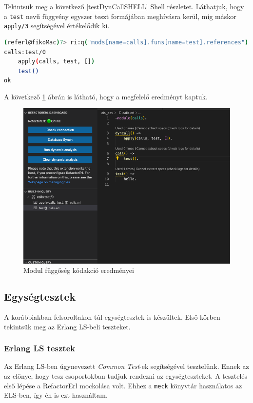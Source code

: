 Tekintsük meg a következő \ref{testDynCallSHELL} Shell részletet. Láthatjuk, hogy a \lstinline{test} nevű függvény egyszer teszt formájában meghívásra kerül, míg máskor \lstinline{apply/3} segítségével értékelődik ki.


\lstset{caption=Függvény dinamikus hívásainak lekérdezésének eredménye, label=testDynCallSHELL} 
\begin{lstlisting}[language={sh}]  
(referl@fikoMac)7> ri:q("mods[name=calls].funs[name=test].references").
calls:test/0
    apply(calls, test, [])
    test()
ok
\end{lstlisting}

A következő \ref{fig:dynCall} ábrán is látható, hogy a megfelelő eredményt kaptuk.

\begin{figure}[H]
  \centering
  \includegraphics[width=0.8\linewidth]{images/testCases/dynCall.png}
  \caption{Modul függőség kódakció eredményei}
  \label{fig:dynCall}
\end{figure}

\newpage

\subsection{Egységtesztek}

A korábbiakban felsoroltakon túl egységtesztek is készültek. Első körben tekintsük meg az Erlang LS-beli teszteket.

\subsubsection{Erlang LS tesztek}

Az Erlang LS-ben úgynevezett \textit{Common Test}-ek \cite{testCT} segítségével tesztelünk. Ennek az az előnye, hogy tesz csoportokban tudjuk rendezni az egységteszteket. A tesztelés első lépése a RefactorErl mockolása volt. Ehhez a \lstinline{meck} könyvtár \cite{testMeck} használatos az ELS-ben, így én is ezt használtam. 

